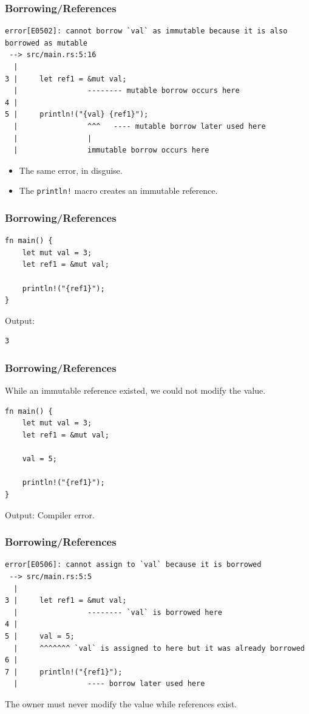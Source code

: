 \begin{frame}[fragile]
    \frametitle{Borrowing/References}
    \begin{verbatim}
error[E0502]: cannot borrow `val` as immutable because it is also borrowed as mutable
 --> src/main.rs:5:16
  |
3 |     let ref1 = &mut val;
  |                -------- mutable borrow occurs here
4 |
5 |     println!("{val} {ref1}");
  |                ^^^   ---- mutable borrow later used here
  |                |
  |                immutable borrow occurs here
    \end{verbatim}
    \pause
    \vfill
    \begin{itemize}
        \item The same error, in disguise.
        \item The \texttt{println!} macro creates an immutable reference.
    \end{itemize}
\end{frame}

\begin{frame}[fragile]
    \frametitle{Borrowing/References}
    \begin{verbatim}
fn main() {
    let mut val = 3;
    let ref1 = &mut val;

    println!("{ref1}");
}
    \end{verbatim}
    \vfill
    Output:
    \pause
    \vfill
    \begin{verbatim}
3
    \end{verbatim}
\end{frame}

\begin{frame}[fragile]
    \frametitle{Borrowing/References}
    While an immutable reference existed, we could not modify the value.
    \vfill
    \begin{verbatim}
fn main() {
    let mut val = 3;
    let ref1 = &mut val;

    val = 5;

    println!("{ref1}");
}
    \end{verbatim}
    \vfill
    Output:
    \pause
    \vfill
    Compiler error.
\end{frame}

\begin{frame}[fragile]
    \frametitle{Borrowing/References}
    \begin{verbatim}
error[E0506]: cannot assign to `val` because it is borrowed
 --> src/main.rs:5:5
  |
3 |     let ref1 = &mut val;
  |                -------- `val` is borrowed here
4 |
5 |     val = 5;
  |     ^^^^^^^ `val` is assigned to here but it was already borrowed
6 |
7 |     println!("{ref1}");
  |                ---- borrow later used here
    \end{verbatim}
    \pause
    \vfill
    The owner must never modify the value while references exist.
\end{frame}

